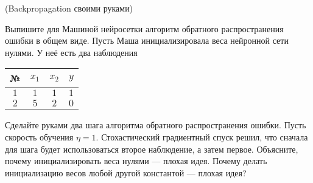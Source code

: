 \begin{problem}{(Backpropagation своими руками)}
\begin{center}
    \end{center} 
    
Выпишите для Машиной нейросетки алгоритм обратного распространения ошибки в общем виде. Пусть Маша инициализировала веса нейронной сети нулями. У неё есть два наблюдения 

\begin{center}
\begin{tabular}{c|c|c|c}
№    &  $x_1$  &  $x_2$  &  $y$ \\ \hline
$1$  &  $1$    &  $1$    &  $1$ \\ 
$2$  &  $5$    &  $2$    &  $0$ \\ 
\end{tabular}
\end{center}

Сделайте руками два шага алгоритма обратного распространения ошибки. Пусть скорость обучения $\eta = 1$. Стохастический градиентный спуск решил, что сначала для шага будет использоваться второе наблюдение, а затем первое. Объясните, почему инициализировать веса нулями --- плохая идея. Почему делать инициализацию весов любой другой константой --- плохая идея? 
\end{problem}

